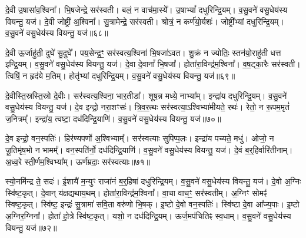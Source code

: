 दे॒वी उ॒षासा॑व॒श्विना᳚।
भि॒षजेन्द्रे॒ सर॑स्वती।
बलं॒ न वाच॑मा॒स्ये᳚।
उ॒षाभ्यां᳚ दधुरिन्द्रि॒यम्।
व॒सु॒वने॑ वसु॒धेय॑स्य वियन्तु॒ यज॑।
दे॒वी जोष्ट्री॑ अ॒श्विना᳚।
सु॒त्रामेन्द्रे॒ सर॑स्वती।
श्रोत्रं॒ न कर्ण॑यो॒र्यशः॑।
जोष्ट्री᳚भ्यां दधुरिन्द्रि॒यम्।
व॒सु॒वने॑ वसु॒धेय॑स्य वियन्तु॒ यज॑॥६८॥\ip

दे॒वी ऊ॒र्जाहु॑ती॒ दुघे॑ सु॒दुघे᳚।
पय॒सेन्द्र॒ꣳ॒ सर॑स्वत्य॒श्विना॑ भि॒षजा॑ऽवत।
शु॒क्रं न ज्योतिः॒ स्तन॑यो॒राहु॑ती धत्त इन्द्रि॒यम्।
व॒सु॒वने॑ वसु॒धेय॑स्य वियन्तु॒ यज॑।
दे॒वा दे॒वानां᳚ भि॒षजा᳚।
होता॑रा॒विन्द्र॑म॒श्विना᳚।
व॒ष॒ट्का॒रैः सर॑स्वती।
त्विषिं॒ न हृद॑ये म॒तिम्।
होतृ॑भ्यां दधुरिन्द्रि॒यम्।
व॒सु॒वने॑ वसु॒धेय॑स्य वियन्तु॒ यज॑॥६९॥\ip

दे॒वीस्ति॒स्रस्ति॒स्रो दे॒वीः।
सर॑स्वत्य॒श्विना॒ भार॒तीडा᳚।
शूष॒न्न मध्ये॒ नाभ्या᳚म्।
इन्द्रा॑य दधुरिन्द्रि॒यम्।
व॒सु॒वने॑ वसु॒धेय॑स्य वियन्तु॒ यज॑।
दे॒व इन्द्रो॒ नरा॒शꣳसः॑।
त्रि॒व॒रू॒थः सर॑स्वत्या॒\-ऽश्विभ्या॑मीयते॒ रथः॑।
रेतो॒ न रू॒पम॒मृतं॑ ज॒नित्रम्᳚।
इन्द्रा॑य॒ त्वष्टा॒ दध॑दिन्द्रि॒याणि॑।
व॒सु॒वने॑ वसु॒धेय॑स्य वियन्तु॒ यज॑॥७०॥\ip

दे॒व इन्द्रो॒ वन॒स्पतिः॑।
हिर॑ण्यपर्णो अ॒श्विभ्याम्᳚।
सर॑स्वत्याः सुपिप्प॒लः।
इन्द्रा॑य पच्यते॒ मधु॑।
ओजो॒ न जू॒तिमृ॑ष॒भो न भामम्᳚।
वन॒स्पति॑र्नो॒ दध॑दिन्द्रि॒याणि॑।
व॒सु॒वने॑ वसु॒धेय॑स्य वियन्तु॒ यज॑।
दे॒वं ब॒र्॒हिर्वारि॑तीनाम्।
अ॒ध्व॒रे स्ती॒र्णम॒श्विभ्या᳚म्।
ऊर्ण॑म्रदाः॒ सर॑स्वत्याः॥७१॥\ip

स्यो॒नमि॑न्द्र ते॒ सदः॑।
ई॒शायै॑ म॒न्युꣳ राजा॑नं ब॒र्॒हिषा॑ दधुरिन्द्रि॒यम्।
व॒सु॒वने॑ वसु॒धेय॑स्य वियन्तु॒ यज॑।
दे॒वो अ॒ग्निः स्वि॑ष्ट॒कृत्।
दे॒वान् य॑क्षद्यथाय॒थम्।
होता॑रा॒विन्द्र॑म॒श्विना᳚।
वा॒चा वाच॒ꣳ॒ सर॑स्वतीम्।
अ॒ग्निꣳ सोमꣴ॑ स्विष्ट॒कृत्।
स्वि॑ष्ट॒ इन्द्रः॑ सु॒त्रामा॑ सवि॒ता वरु॑णो भि॒षक्।
इ॒ष्टो दे॒वो वन॒स्पतिः॑।
स्वि॑ष्टा दे॒वा आ᳚ज्य॒पाः।
इ॒ष्टो अ॒ग्निर॒ग्निना᳚।
होता॑ हो॒त्रे स्वि॑ष्ट॒कृत्।
यशो॒ न दध॑दिन्द्रि॒यम्।
ऊर्ज॒मप॑चितिꣴ स्व॒धाम्।
व॒सु॒वने॑ वसु॒धेय॑स्य वियन्तु॒ यज॑॥७२॥\ip{}

